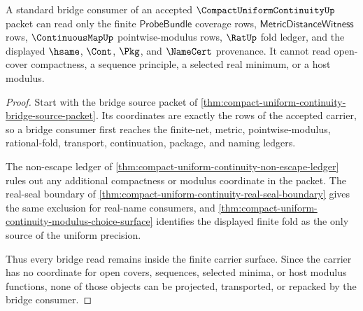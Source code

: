 \begin{theorem}
\label{thm:compact-uniform-continuity-bridge-non-escape-boundary}
A standard bridge consumer of an accepted $\CompactUniformContinuityUp$ packet can read only the finite $\mathsf{ProbeBundle}$ coverage rows, $\mathsf{MetricDistanceWitness}$ rows, $\ContinuousMapUp$ pointwise-modulus rows, $\RatUp$ fold ledger, and the displayed $\hsame$, $\Cont$, $\Pkg$, and $\NameCert$ provenance. It cannot read open-cover compactness, a sequence principle, a selected real minimum, or a host modulus.
\end{theorem}
\begin{proof}
Start with the bridge source packet of \autoref{thm:compact-uniform-continuity-bridge-source-packet}. Its coordinates are exactly the rows of the accepted carrier, so a bridge consumer first reaches the finite-net, metric, pointwise-modulus, rational-fold, transport, continuation, package, and naming ledgers.

The non-escape ledger of \autoref{thm:compact-uniform-continuity-non-escape-ledger} rules out any additional compactness or modulus coordinate in the packet. The real-seal boundary of \autoref{thm:compact-uniform-continuity-real-seal-boundary} gives the same exclusion for real-name consumers, and \autoref{thm:compact-uniform-continuity-modulus-choice-surface} identifies the displayed finite fold as the only source of the uniform precision.

Thus every bridge read remains inside the finite carrier surface. Since the carrier has no coordinate for open covers, sequences, selected minima, or host modulus functions, none of those objects can be projected, transported, or repacked by the bridge consumer.
\end{proof}

